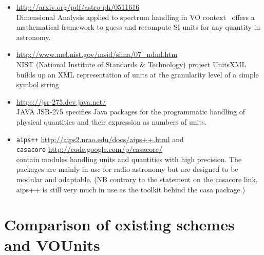 \documentclass[11pt,notitlepage,onecolumn]{ivoa}
\newcommand{\violet}{\textcolor[rgb]{0.50,0.00,0.50}}
\begin{document}
\begin{itemize}
\item
\violet{\footnotesize{\url{http://arxiv.org/pdf/astro-ph/0511616}}}\\ 
Dimensional Analysis applied to spectrum handling in VO context~\citep{osuna05}
offers a mathematical framework to guess and recompute
SI units for any quantity in astronomy.
\item
\violet{\footnotesize{\url{http://www.mel.nist.gov/msid/sima/07_ndml.htm}}}\\
NIST (National Institute of Standards \& Technology) project
UnitsXML builds up an XML representation of units at the granularity
level of a simple symbol string
\item \violet{\footnotesize{\url{https://jsr-275.dev.java.net/}}}\\
JAVA JSR-275 specifies Java packages for the programmatic
handling of physical quantities and their expression as numbers of
units.
\item  \texttt{aips++}
\violet{\footnotesize{\url{http://aips2.nrao.edu/docs/aips++.html}}} and\\
 \texttt{casacore} \violet{\footnotesize{\url{http://code.google.com/p/casacore/}}}\\ contain modules handling units and
quantities with high precision. The packages are mainly in use for
radio astronomy but are designed to be modular and adaptable.  (NB
contrary to the statement on the casacore link, aips++ is still very much in
use as the toolkit behind the {\sc casa} package.)
\end{itemize}

\section{Comparison of existing schemes and VOUnits\label{appx:comparisons}}

\end{document}
